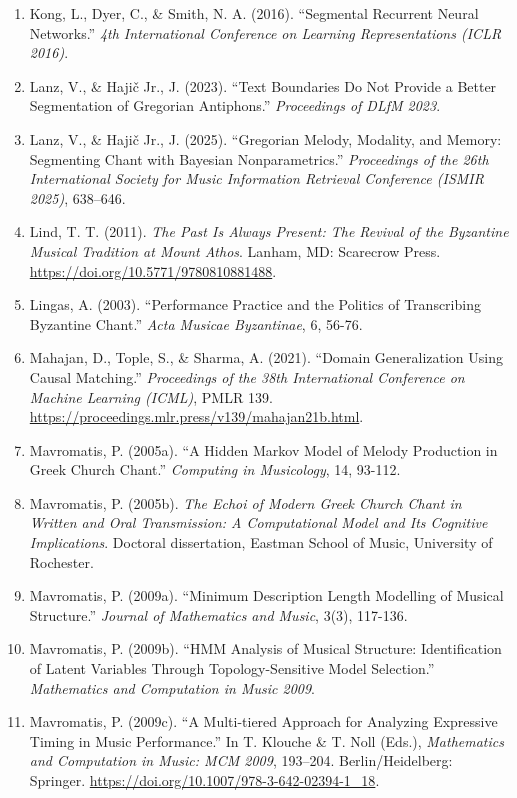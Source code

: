 \documentclass[11pt,a4paper]{article}
\begin{document}
\begin{enumerate}
\item
 Kong, L., Dyer, C., \& Smith, N. A. (2016). ``Segmental Recurrent Neural Networks.'' \emph{4th International Conference on Learning Representations (ICLR 2016)}.
\item
 Lanz, V., \& Hajič Jr., J. (2023). ``Text Boundaries Do Not Provide a Better Segmentation of Gregorian Antiphons.'' \emph{Proceedings of DLfM 2023}.
\item
 Lanz, V., \& Hajič Jr., J. (2025). ``Gregorian Melody, Modality, and Memory: Segmenting Chant with Bayesian Nonparametrics.'' \emph{Proceedings of the 26th International Society for Music Information Retrieval Conference (ISMIR 2025)}, 638--646.
\item
 Lind, T. T. (2011). \emph{The Past Is Always Present: The Revival of the Byzantine Musical Tradition at Mount Athos}. Lanham, MD: Scarecrow Press. \url{https://doi.org/10.5771/9780810881488}.
\item
 Lingas, A. (2003). ``Performance Practice and the Politics of Transcribing Byzantine Chant.'' \emph{Acta Musicae Byzantinae}, 6, 56-76.
\item
 Mahajan, D., Tople, S., \& Sharma, A. (2021). ``Domain Generalization Using Causal Matching.'' \emph{Proceedings of the 38th International Conference on Machine Learning (ICML)}, PMLR 139. \url{https://proceedings.mlr.press/v139/mahajan21b.html}.
\item
 Mavromatis, P. (2005a). ``A Hidden Markov Model of Melody Production in Greek Church Chant.'' \emph{Computing in Musicology}, 14, 93-112.
\item
 Mavromatis, P. (2005b). \emph{The Echoi of Modern Greek Church Chant in Written and Oral Transmission: A Computational Model and Its Cognitive Implications}. Doctoral dissertation, Eastman School of Music, University of Rochester.
\item
 Mavromatis, P. (2009a). ``Minimum Description Length Modelling of Musical Structure.'' \emph{Journal of Mathematics and Music}, 3(3), 117-136.
\item
 Mavromatis, P. (2009b). ``HMM Analysis of Musical Structure: Identification of Latent Variables Through Topology-Sensitive Model Selection.'' \emph{Mathematics and Computation in Music 2009}.
\item
 Mavromatis, P. (2009c). ``A Multi-tiered Approach for Analyzing Expressive Timing in Music Performance.'' In T. Klouche \& T. Noll (Eds.), \emph{Mathematics and Computation in Music: MCM 2009}, 193--204. Berlin/Heidelberg: Springer. \url{https://doi.org/10.1007/978-3-642-02394-1_18}.

\end{enumerate}
\end{document}
